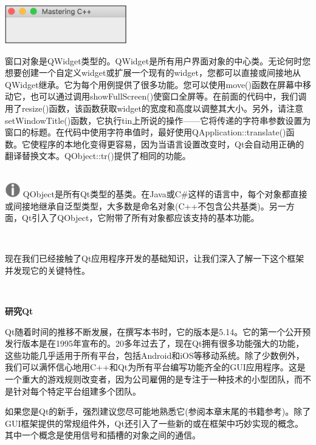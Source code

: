 \begin{center}
	\includegraphics[width=0.4\textwidth]{content/Section-2/Chapter-14/7}
\end{center}

窗口对象是QWidget类型的。QWidget是所有用户界面对象的中心类。无论何时您想要创建一个自定义widget或扩展一个现有的widget，您都可以直接或间接地从QWidget继承。它为每个用例提供了很多功能。您可以使用move()函数在屏幕中移动它，也可以通过调用showFullScreen()使窗口全屏等。在前面的代码中，我们调用了resize()函数，该函数获取widget的宽度和高度以调整其大小。另外，请注意setWindowTitle()函数，它执行tin上所说的操作——它将传递的字符串参数设置为窗口的标题。在代码中使用字符串值时，最好使用QApplication::translate()函数。它使程序的本地化变得更容易，因为当语言设置改变时，Qt会自动用正确的翻译替换文本。QObject::tr()提供了相同的功能。 \par

\hspace*{\fill} \\ %
\includegraphics[width=0.05\textwidth]{images/warn}
QObject是所有Qt类型的基类。在Java或C\#这样的语言中，每个对象都直接或间接地继承自泛型类型，大多数是命名对象(C++不包含公共基类)。另一方面，Qt引入了QObject，它附带了所有对象都应该支持的基本功能。 \par
\noindent\textbf{}\ \par

现在我们已经接触了Qt应用程序开发的基础知识，让我们深入了解一下这个框架并发现它的关键特性。 \par

\noindent\textbf{}\ \par
\textbf{研究Qt} \ \par
Qt随着时间的推移不断发展，在撰写本书时，它的版本是5.14。它的第一个公开预发行版本是在1995年宣布的。20多年过去了，现在Qt拥有很多功能强大的功能，这些功能几乎适用于所有平台，包括Android和iOS等移动系统。除了少数例外，我们可以满怀信心地用C++和Qt为所有平台编写功能齐全的GUI应用程序。这是一个重大的游戏规则改变者，因为公司雇佣的是专注于一种技术的小型团队，而不是针对每个特定平台组建多个团队。 \par
如果您是Qt的新手，强烈建议您尽可能地熟悉它(参阅本章末尾的书籍参考)。除了GUI框架提供的常规组件外，Qt还引入了一些新的或在框架中巧妙实现的概念。其中一个概念是使用信号和插槽的对象之间的通信。 \par

